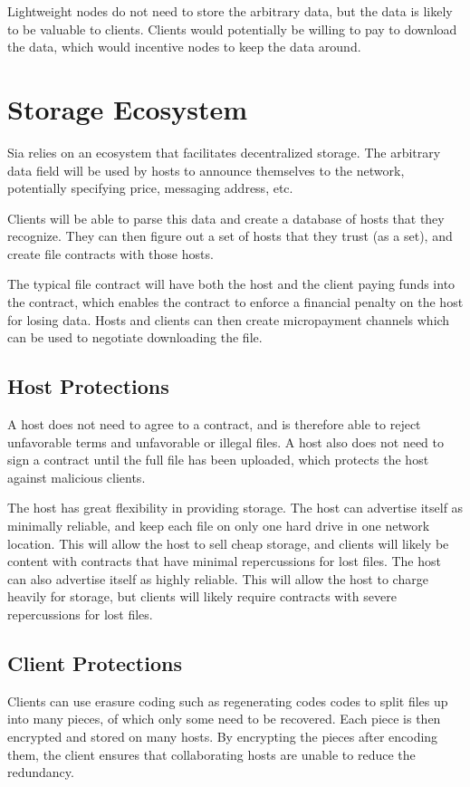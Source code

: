 \documentclass[twocolumn]{article}
\begin{document}
Lightweight nodes do not need to store the arbitrary data, but the data is likely to be valuable to clients.
Clients would potentially be willing to pay to download the data, which would incentive nodes to keep the data around.

\section{Storage Ecosystem}
Sia relies on an ecosystem that facilitates decentralized storage.
The arbitrary data field will be used by hosts to announce themselves to the network, potentially specifying price, messaging address, etc.

Clients will be able to parse this data and create a database of hosts that they recognize.
They can then figure out a set of hosts that they trust (as a set), and create file contracts with those hosts.

The typical file contract will have both the host and the client paying funds into the contract, which enables the contract to enforce a financial penalty on the host for losing data.
Hosts and clients can then create micropayment channels \cite{mpc} which can be used to negotiate downloading the file.

\subsection{Host Protections}
A host does not need to agree to a contract, and is therefore able to reject unfavorable terms and unfavorable or illegal files.
A host also does not need to sign a contract until the full file has been uploaded, which protects the host against malicious clients.

The host has great flexibility in providing storage.
The host can advertise itself as minimally reliable, and keep each file on only one hard drive in one network location.
This will allow the host to sell cheap storage, and clients will likely be content with contracts that have minimal repercussions for lost files.
The host can also advertise itself as highly reliable.
This will allow the host to charge heavily for storage, but clients will likely require contracts with severe repercussions for lost files.

\subsection{Client Protections}
Clients can use erasure coding such as regenerating codes \cite{reg} codes to split files up into many pieces, of which only some need to be recovered.
Each piece is then encrypted and stored on many hosts.
By encrypting the pieces after encoding them, the client ensures that collaborating hosts are unable to reduce the redundancy.
\end{document}
